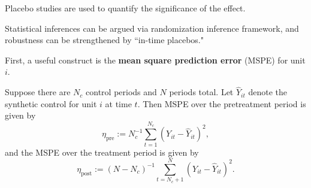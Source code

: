 \documentclass[notes,11pt, aspectratio=169]{beamer}
\begin{document}
\begin{frame}{}

    Placebo studies are used to quantify the significance of the effect.\pause 
    
    \medskip

    Statistical inferences can be argued via randomization inference framework, and robustness can
    be strengthened by ``in-time placebos."
    
\end{frame}

\begin{frame}{}

    First, a useful construct is the \textbf{mean square prediction error} (MSPE) for unit $i$. \pause 

    \medskip

    Suppose there are $N_c$ control periods and $N$ periods total. Let
    $\hat Y_{it}$ denote the synthetic control for unit $i$ at
    time $t$. Then MSPE over the pretreatment
    period is given by
    $$
    \eta _{\text{pre}} := N_c^{-1}\sum _{t = 1} ^ {N_c} (Y_{it} - \hat Y_{it})^2,
    $$
    and the MSPE over the treatment period is given by
    $$
    \eta _{\text{post}} := (N-N_c)^{-1} \sum _{t=N_c + 1} ^ N (Y_{it} - \hat Y_{it}) ^2.
    $$
    
\end{frame}
\end{document}

